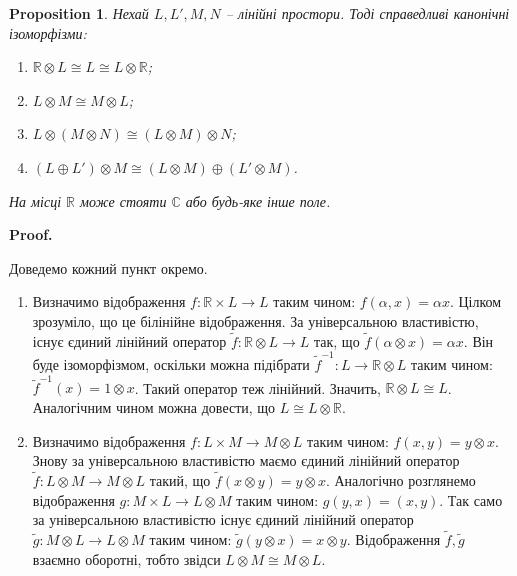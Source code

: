 \documentclass[a4paper, 10pt]{article}
\makeatletter
\theoremstyle{theoremdd}
\newtheorem{proposition}[theorem]{Proposition}
\renewenvironment{proof}[1][Proof.\\]{\par
\pushQED{\hfill \qed}%
\normalfont \topsep6\p@\@plus6\p@\relax
\trivlist
\item\relax
{\bfseries
#1\@addpunct{.}}\hspace\labelsep\ignorespaces
}{%
\popQED\endtrivlist\@endpefalse
}
\makeatother
\begin{document}
\begin{proposition}
Нехай $L,L',M,N$ -- лінійні простори. Тоді справедливі канонічні ізоморфізми:
\begin{enumerate}[nosep,wide=0pt,label={\arabic*)}]
\item $\mathbb{R} \otimes L \cong L \cong L \otimes \mathbb{R}$;
\item $L \otimes M \cong M \otimes L$;
\item $L \otimes (M \otimes N) \cong (L \otimes M) \otimes N$;
\item $(L \oplus L') \otimes M \cong (L \otimes M) \oplus (L' \otimes M)$.
\end{enumerate}
На місці $\mathbb{R}$ може стояти $\mathbb{C}$ або будь-яке інше поле.
\end{proposition}

\begin{proof}
Доведемо кожний пункт окремо.
\begin{enumerate}[wide=0pt,label={\arabic*)}]
\item Визначимо відображення $f \colon \mathbb{R} \times L \to L$ таким чином: $f(\alpha,x) = \alpha x$. Цілком зрозуміло, що це білінійне відображення. За універсальною властивістю, існує єдиний лінійний оператор $\tilde{f} \colon \mathbb{R} \otimes L \to L$ так, що $\tilde{f}(\alpha \otimes x) = \alpha x$. Він буде ізоморфізмом, оскільки можна підібрати $\tilde{f}^{-1} \colon L \to \mathbb{R} \otimes L$ таким чином: $\tilde{f}^{-1}(x) = 1 \otimes x$. Такий оператор теж лінійний. Значить, $\mathbb{R} \otimes L \cong L$.\\
Аналогічним чином можна довести, що $L \cong L \otimes \mathbb{R}$.

\item Визначимо відображення $f \colon L \times M \to M \otimes L$ таким чином: $f(x,y) = y \otimes x$. Знову за універсальною властивістю маємо єдиний лінійний оператор $\tilde{f} \colon L \otimes M \to M \otimes L$ такий, що $\tilde{f}(x \otimes y) = y \otimes x$. Аналогічно розглянемо відображення $g \colon M \times L \to L \otimes M$ таким чином: $g(y,x) = (x,y)$. Так само за універсальною властивістю існує єдиний лінійний оператор $\tilde{g} \colon M \otimes L \to L \otimes M$ таким чином: $\tilde{g}(y \otimes x) = x \otimes y$. Відображення $\tilde{f},\tilde{g}$ взаємно оборотні, тобто звідси $L \otimes M \cong M \otimes L$.


\end{enumerate}
\end{proof}
\end{document}
